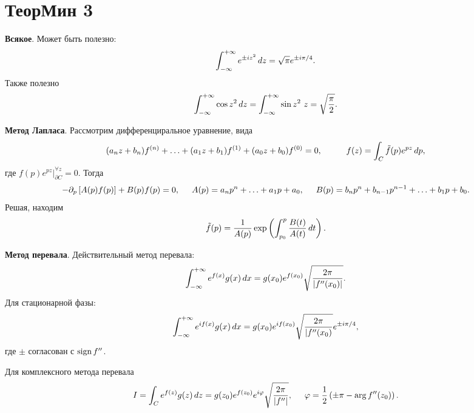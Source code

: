 \section{ТеорМин 3}

\textbf{Всякое}. Может быть полезно:
\begin{equation*}
    \int_{-\infty}^{+\infty} e^{\pm i z^2} \, d z = \sqrt{\pi} e^{\pm i \pi / 4}.
\end{equation*}
Также полезно
\begin{equation*}
    \int_{-\infty}^{+\infty} \cos z^2 \, d z = \int_{-\infty}^{+\infty} \sin z^2 \ z = \sqrt{\frac{\pi}{2}}.
\end{equation*}

\textbf{Метод Лапласа}. Рассмотрим дифференциральное уравнение, вида
\begin{equation*}
    (a_n z + b_n) f^{(n)} + \ldots + (a_1 z + b_1) f^{(1)} + (a_0 z + b_0) f^{(0)} = 0,
    \hspace{10 mm} 
    f(z) = \int_C \tilde{f} (p) e^{pz} \d p,
\end{equation*}
где $f(p) e^{pz} |_{\partial C}^{\forall  z} = 0$. Тогда
\begin{equation*}
    - \partial_p \left[ A(p) f(p)\right] + B(p) f(p) = 0,
    \hspace{5 mm} 
    A(p) = a_n p^n +\ldots + a_1 p + a_0,
    \hspace{5 mm} 
    B(p) = b_n p^n + b_{n-1} p^{n-1} + \ldots + b_1 p + b_0.
\end{equation*}
Решая, находим
\begin{equation*}
    \tilde{f}(p) = \frac{1}{A(p)} \exp\left(
        \int_{p_0}^{p} \frac{B(t)}{A(t)}\, d t
    \right).
\end{equation*}


\textbf{Метод перевала}. Действительный метод перевала:
\begin{equation*}
    \int_{-\infty}^{+\infty} e^{f(x)} g(x) \, d x = g(x_0) e^{f(x_0)} \sqrt{\frac{2\pi}{|f''(x_0)|}}.
\end{equation*}
Для стационарной фазы:
\begin{equation*}
    \int_{-\infty}^{+\infty} e^{i f(x)} g(x) \, d x = g(x_0) e^{i f (x_0)} 
    \sqrt{\frac{2\pi}{|f''(x_0)}} e^{\pm i \pi/4},
\end{equation*} 
где $\pm$ согласован с $\mathop{\mathrm{sign}}\nolimits f''$. 

Для комплексного метода перевала
\begin{equation*}
    I = \int_C e^{f(z)} g(z) \, d z = g(z_0) e^{f(z_0)} e^{i \varphi} \sqrt{\frac{2\pi}{|f''|}},
    \hspace{5 mm} 
    \varphi = \frac{1}{2}\left(\pm \pi - \arg f''(z_0) \right).
\end{equation*}




